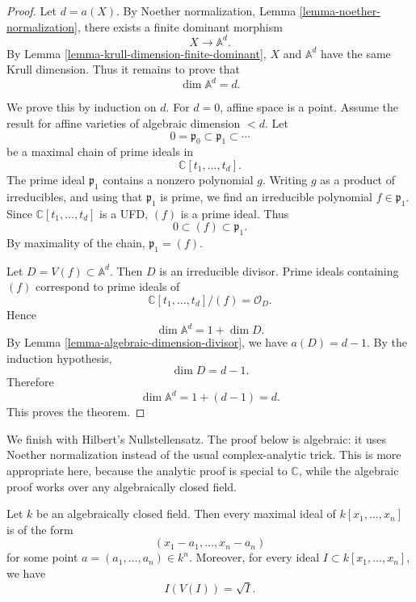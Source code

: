 \begin{proof}
Let $d=a(X)$.
By Noether normalization,
Lemma
\ref{lemma-noether-normalization},
there exists a finite dominant morphism
$$
X\to \mathbb{A}^d.
$$
By Lemma
\ref{lemma-krull-dimension-finite-dominant},
$X$ and $\mathbb{A}^d$ have the same
Krull dimension.
Thus it remains to prove that
$$
\dim \mathbb{A}^d=d.
$$

We prove this by induction on $d$.
For $d=0$, affine space is a point.
Assume the result for affine varieties
of algebraic dimension $<d$.
Let
$$
0=\mathfrak{p}_0\subset \mathfrak{p}_1
\subset \cdots
$$
be a maximal chain of prime ideals in
$$
\mathbb{C}[t_1,\ldots,t_d].
$$
The prime ideal $\mathfrak{p}_1$ contains
a nonzero polynomial $g$.
Writing $g$ as a product of irreducibles,
and using that $\mathfrak{p}_1$ is prime,
we find an irreducible polynomial
$f\in \mathfrak{p}_1$.
Since $\mathbb{C}[t_1,\ldots,t_d]$
is a UFD, $(f)$ is a prime ideal.
Thus
$$
0\subset (f)\subset \mathfrak{p}_1.
$$
By maximality of the chain,
$\mathfrak{p}_1=(f)$.

Let $D=V(f)\subset \mathbb{A}^d$.
Then $D$ is an irreducible divisor.
Prime ideals containing $(f)$ correspond
to prime ideals of
$$
\mathbb{C}[t_1,\ldots,t_d]/(f)
=\mathcal{O}_D.
$$
Hence
$$
\dim \mathbb{A}^d=1+\dim D.
$$
By Lemma
\ref{lemma-algebraic-dimension-divisor},
we have $a(D)=d-1$.
By the induction hypothesis,
$$
\dim D=d-1.
$$
Therefore
$$
\dim \mathbb{A}^d=1+(d-1)=d.
$$
This proves the theorem.
\end{proof}

\medskip\noindent
We finish with Hilbert's Nullstellensatz.
The proof below is algebraic: it uses
Noether normalization instead of the usual
complex-analytic trick.
This is more appropriate here, because the
analytic proof is special to
$\mathbb{C}$, while the algebraic proof
works over any algebraically closed field.

\begin{theorem}
\label{theorem-hilbert-nullstellensatz}
Let $k$ be an algebraically closed field.
Then every maximal ideal of
$k[x_1,\ldots,x_n]$ is of the form
$$
(x_1-a_1,\ldots,x_n-a_n)
$$
for some point $a=(a_1,\ldots,a_n)\in k^n$.
Moreover, for every ideal
$I\subset k[x_1,\ldots,x_n]$,
we have
$$
I(V(I))=\sqrt{I}.
$$
\end{theorem}


